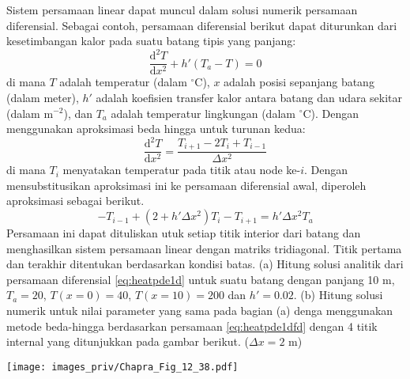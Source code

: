 \begin{soal}
Sistem persamaan linear dapat muncul dalam solusi numerik
persamaan diferensial. Sebagai contoh, persamaan diferensial
berikut dapat diturunkan dari kesetimbangan kalor
pada suatu batang tipis yang panjang:
\begin{equation*}
\frac{\mathrm{d}^2 T}{\mathrm{d}x^2} + h'(T_{a} - T) = 0
\end{equation*}
di mana $T$ adalah temperatur (dalam $^{\circ}\mathrm{C}$),
$x$ adalah posisi sepanjang batang (dalam meter), $h'$ adalah
koefisien transfer kalor antara batang dan udara sekitar (dalam
$\mathrm{m}^{-2}$), dan $T_{a}$ adalah temperatur lingkungan
(dalam $^{\circ}\mathrm{C}$). Dengan menggunakan aproksimasi
beda hingga untuk turunan kedua:
\begin{equation}
\frac{\mathrm{d}^2 T}{\mathrm{d}x^2} = \frac{T_{i+1} - 2T_{i} + T_{i-1}}{\Delta x^2}
\label{eq:heatpde1d}
\end{equation}
di mana $T_{i}$ menyatakan temperatur pada titik atau node ke-$i$.
Dengan mensubstitusikan aproksimasi ini ke persamaan diferensial awal,
diperoleh aproksimasi sebagai berikut.
\begin{equation}
-T_{i-1} + (2 + h'\Delta x^2)T_{i} - T_{i+1} = h'\Delta x^2 T_{a}
\label{eq:heatpde1dfd}
\end{equation}
Persamaan ini dapat dituliskan utuk setiap titik interior dari batang dan menghasilkan
sistem persamaan linear dengan matriks tridiagonal.
Titik pertama dan terakhir ditentukan berdasarkan kondisi batas.
(a) Hitung solusi analitik dari persamaan diferensial \eqref{eq:heatpde1d}
untuk suatu batang dengan panjang 10 m, $T_a = 20$, $T(x=0) = 40$, 
$T(x=10) = 200$ dan $h' = 0.02$.
(b) Hitung solusi numerik untuk nilai parameter yang sama pada bagian (a) denga
menggunakan metode beda-hingga berdasarkan persamaan \eqref{eq:heatpde1dfd}
dengan 4 titik internal yang ditunjukkan pada gambar berikut.
($\Delta x = 2$ m)

{\centering
\texttt{[image: images\_priv/Chapra\_Fig\_12\_38.pdf]}
\par}

\end{soal}